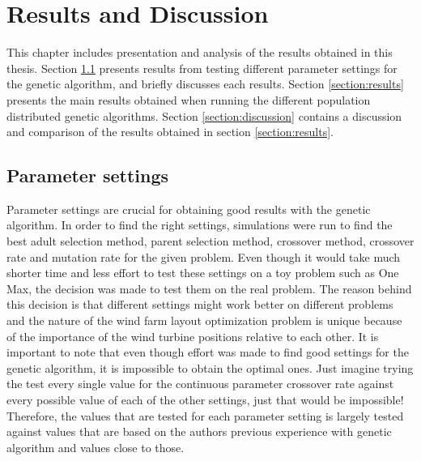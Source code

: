 \chapter{Results and Discussion}\label{chapter:results}
This chapter includes presentation and analysis of the results obtained in this thesis. Section \ref{section:parameter settings} presents results from testing different parameter settings for the genetic algorithm, and briefly discusses each results. Section \ref{section:results} presents the main results obtained when running the different population distributed genetic algorithms. Section \ref{section:discussion} contains a discussion and comparison of the results obtained in section \ref{section:results}.


\section{Parameter settings}\label{section:parameter settings}
Parameter settings are crucial for obtaining good results with the genetic algorithm. In order to find the right settings, simulations were run to find the best adult selection method, parent selection method, crossover method, crossover rate and mutation rate for the given problem. Even though it would take much shorter time and less effort to test these settings on a toy problem such as One Max, the decision was made to test them on the real problem. The reason behind this decision is that different settings might work better on different problems and the nature of the wind farm layout optimization problem is unique because of the importance of the wind turbine positions relative to each other. It is important to note that even though effort was made to find good settings for the genetic algorithm,  it is impossible to obtain the optimal ones. Just imagine trying the test every single value for the continuous parameter crossover rate against every possible value of each of the other settings, just that would be impossible! Therefore, the values that are tested for each parameter setting is largely tested against values that are based on the authors previous experience with genetic algorithm and values close to those.\\

